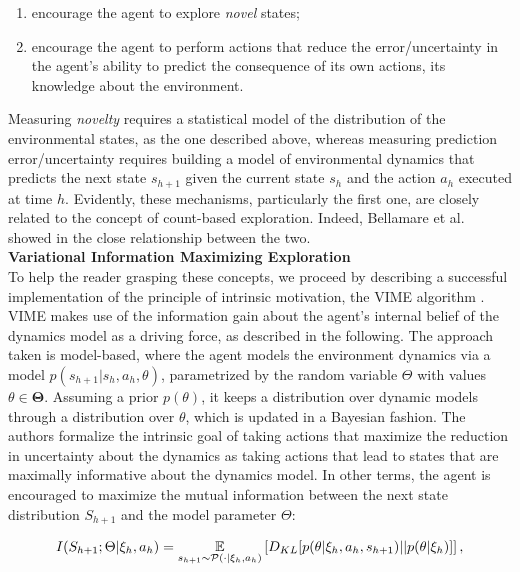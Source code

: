 \begin{enumerate}
\item encourage the agent to explore \emph{novel} states;
\item encourage the agent to perform actions that reduce the error/uncertainty in the agent’s ability to predict the consequence of its own actions, \ie its knowledge about the environment.
\end{enumerate}

Measuring \emph{novelty} requires a statistical model of the distribution of the environmental states, as the one described above, whereas measuring prediction error/uncertainty requires building a model of environmental dynamics that predicts the next state $s_{h+1}$ given the current state $s_h$ and the action $a_h$ executed at time $h$. Evidently, these mechanisms, particularly the first one, are closely related to the concept of count-based exploration. Indeed, Bellamare et al. showed in \cite{bellemare2016unifying} the close relationship between the two.\\

\textbf{Variational Information Maximizing Exploration}\\
To help the reader grasping these concepts, we proceed by describing a successful implementation of the principle of intrinsic motivation, the \gls{VIME} algorithm \cite{houthooft2016vime}. \gls{VIME} makes use of the information gain about the agent’s internal belief of the dynamics model as a driving force, as described in the following. The approach taken is model-based, where the agent models the environment dynamics via a model $p(s_{h+1}|s_h,a_h,\theta)$, parametrized by the random variable $\Theta$ with values $\theta\in\boldsymbol{\Theta}$. Assuming a prior $p(\theta)$, it keeps a distribution over dynamic models through a distribution over $\theta$, which is updated in a Bayesian fashion. The authors formalize the intrinsic goal of taking actions that maximize the reduction in uncertainty about the dynamics as taking actions that lead to states that are maximally informative about the dynamics model. In other terms, the agent is encouraged to maximize the mutual information between the next state distribution $S_{h+1}$ and the model parameter $\Theta$:

\begin{align}
I(S_{h+1};\Theta|\xi_h,a_h)=\underset{s_{h+1}\sim\mathcal{P}(\cdot|\xi_h,a_h)}{\mathbb{E}}\left[{D_{KL}[p(\theta|\xi_h,a_h,s_{h+1})||p(\theta|\xi_h)]}\right],
\end{align}

